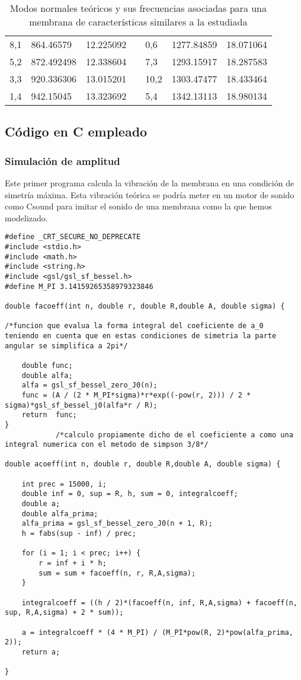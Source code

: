 \documentclass[journal, a4paper,onecolumn]{IEEEtran}
\begin{document}
\begin{table}[H]
\begin{tabular}{l|l|lll|l|l}
8,1  & 864.46579  & 12.225092     &  & 0,6  & 1277.84859 & 18.071064     \\ \cline{1-3} \cline{5-7} 
5,2  & 872.492498 & 12.338604     &  & 7,3  & 1293.15917 & 18.287583     \\ \cline{1-3} \cline{5-7} 
3,3  & 920.336306 & 13.015201     &  & 10,2 & 1303.47477 & 18.433464     \\ \cline{1-3} \cline{5-7} 
1,4  & 942.15045  & 13.323692     &  & 5,4  & 1342.13113 & 18.980134    
\end{tabular}
\caption{Modos normales teóricos y sus frecuencias asociadas para una membrana de características similares a la estudiada}
\label{frecuencias_teoricas}
\end{table}

\subsection{Código en C empleado}

\subsubsection{Simulación de amplitud}

Este primer programa calcula la vibración de la membrana en una condición de simetría máxima. Esta vibración teórica se podría meter en un motor de sonido como Csound para imitar el sonido de una membrana como la que hemos modelizado.

\begin{lstlisting}
#define _CRT_SECURE_NO_DEPRECATE
#include <stdio.h>
#include <math.h>
#include <string.h>
#include <gsl/gsl_sf_bessel.h>
#define M_PI 3.14159265358979323846

double facoeff(int n, double r, double R,double A, double sigma) {  

/*funcion que evalua la forma integral del coeficiente de a_0			teniendo en cuenta que en estas condiciones de simetria la parte angular se simplifica a 2pi*/

	double func;
	double alfa;
	alfa = gsl_sf_bessel_zero_J0(n);
	func = (A / (2 * M_PI*sigma)*r*exp((-pow(r, 2))) / 2 * sigma)*gsl_sf_bessel_j0(alfa*r / R);
	return  func;
}
			/*calculo propiamente dicho de el coeficiente a como una integral numerica con el metodo de simpson 3/8*/
			
double acoeff(int n, double r, double R,double A, double sigma) {

	int prec = 15000, i;
	double inf = 0, sup = R, h, sum = 0, integralcoeff;
	double a;
	double alfa_prima;
	alfa_prima = gsl_sf_bessel_zero_J0(n + 1, R);
	h = fabs(sup - inf) / prec;

	for (i = 1; i < prec; i++) {
		r = inf + i * h;
		sum = sum + facoeff(n, r, R,A,sigma);
	}

	integralcoeff = ((h / 2)*(facoeff(n, inf, R,A,sigma) + facoeff(n, sup, R,A,sigma) + 2 * sum));

	a = integralcoeff * (4 * M_PI) / (M_PI*pow(R, 2)*pow(alfa_prima, 2));
	return a;

}
\end{lstlisting}
\end{document}
